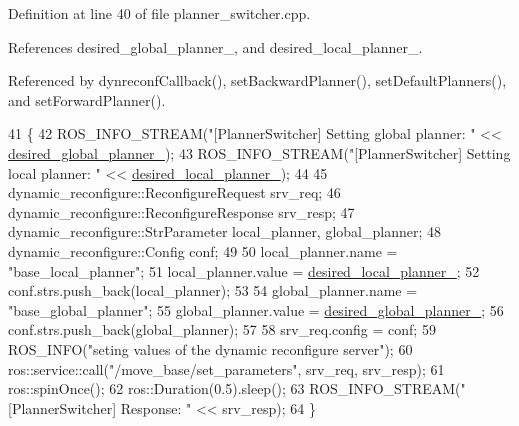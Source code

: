 Definition at line 40 of file planner\+\_\+switcher.\+cpp.



References desired\+\_\+global\+\_\+planner\+\_\+, and desired\+\_\+local\+\_\+planner\+\_\+.



Referenced by dynreconf\+Callback(), set\+Backward\+Planner(), set\+Default\+Planners(), and set\+Forward\+Planner().


\begin{DoxyCode}
41 \{
42   ROS\_INFO\_STREAM(\textcolor{stringliteral}{"[PlannerSwitcher] Setting global planner: "} << 
      \hyperlink{classmove__base__z__client_1_1PlannerSwitcher_a004c15858f0a6b9abcd8211d58a7e34c}{desired\_global\_planner\_});
43   ROS\_INFO\_STREAM(\textcolor{stringliteral}{"[PlannerSwitcher] Setting local planner: "} << 
      \hyperlink{classmove__base__z__client_1_1PlannerSwitcher_ae47bd6c9c70b27cddcb394f26bb9372d}{desired\_local\_planner\_});
44 
45   dynamic\_reconfigure::ReconfigureRequest srv\_req;
46   dynamic\_reconfigure::ReconfigureResponse srv\_resp;
47   dynamic\_reconfigure::StrParameter local\_planner, global\_planner;
48   dynamic\_reconfigure::Config conf;
49 
50   local\_planner.name = \textcolor{stringliteral}{"base\_local\_planner"};
51   local\_planner.value = \hyperlink{classmove__base__z__client_1_1PlannerSwitcher_ae47bd6c9c70b27cddcb394f26bb9372d}{desired\_local\_planner\_};
52   conf.strs.push\_back(local\_planner);
53 
54   global\_planner.name = \textcolor{stringliteral}{"base\_global\_planner"};
55   global\_planner.value = \hyperlink{classmove__base__z__client_1_1PlannerSwitcher_a004c15858f0a6b9abcd8211d58a7e34c}{desired\_global\_planner\_};
56   conf.strs.push\_back(global\_planner);
57 
58   srv\_req.config = conf;
59   ROS\_INFO(\textcolor{stringliteral}{"seting values of the dynamic reconfigure server"});
60   ros::service::call(\textcolor{stringliteral}{"/move\_base/set\_parameters"}, srv\_req, srv\_resp);
61   ros::spinOnce();
62   ros::Duration(0.5).sleep();
63   ROS\_INFO\_STREAM(\textcolor{stringliteral}{"[PlannerSwitcher] Response: "} << srv\_resp);
64 \}
\end{DoxyCode}


